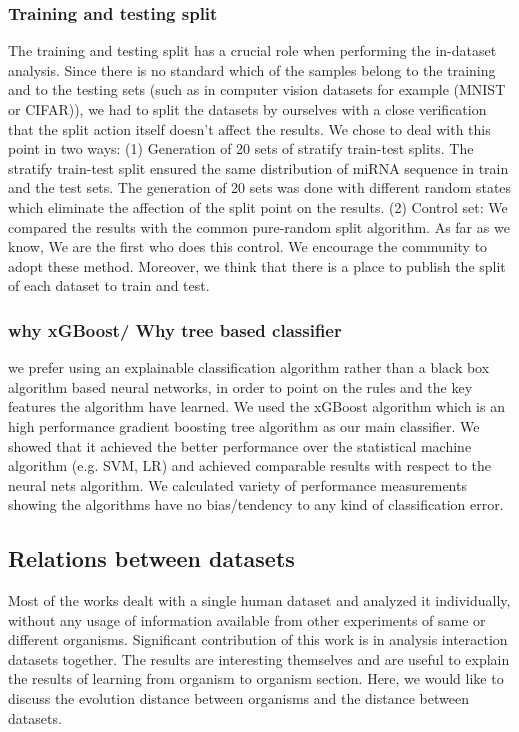 \documentclass{bmcart}
\begin{document}
\subsubsection*{Training and testing split} 
The training and testing split has a crucial role when performing the in-dataset analysis. Since there is no standard which of the samples belong to the training and to the testing sets (such as in computer vision datasets for example (MNIST or CIFAR)), we had to split the datasets by ourselves with a close verification that the split action itself doesn't affect the results. We chose to deal with this point in two ways: (1) Generation of 20 sets of stratify train-test splits. The stratify train-test split ensured the same distribution of miRNA sequence in train and the test sets. The generation of 20 sets was done with different random states which eliminate the affection of the split point on the results. (2) Control set: We compared the results with the common pure-random split algorithm. 
As far as we know, We are the first who does this control. We encourage the community to adopt these method. Moreover, we think that there is a place to publish the split of each dataset to train and test.

\subsubsection*{why xGBoost/ Why tree based classifier} 
we prefer using an explainable classification algorithm rather than a black box algorithm based neural networks, in order to point on the rules and the key features the algorithm have learned. We used the xGBoost algorithm which is an high performance gradient boosting tree algorithm as our main classifier. We showed that it achieved the better performance over the statistical machine algorithm (e.g. SVM, LR) and achieved comparable results with respect to the neural nets algorithm.
We calculated variety of performance measurements showing the algorithms have no bias/tendency to any kind of classification error. 

\subsection*{Relations between datasets}
Most of the works dealt with a single human dataset and analyzed it individually, without any usage of information available from other experiments of same or different organisms. Significant contribution of this work is in analysis interaction datasets together. The results are interesting themselves and are useful to explain the results of learning from organism to organism section. Here, we would like to discuss the evolution distance between organisms and the distance between datasets.
\end{document}
